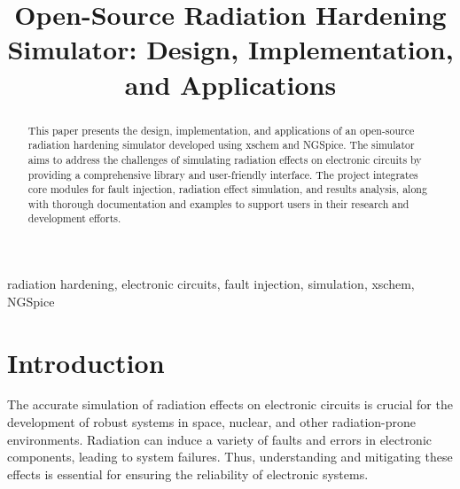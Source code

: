 \documentclass[conference]{IEEEtran}
\begin{document}
\title{Open-Source Radiation Hardening Simulator: Design, Implementation, and Applications}

\author{
\and
{}
\and
{}
\and
{}
}

\maketitle

\begin{abstract}
This paper presents the design, implementation, and applications of an open-source radiation hardening simulator developed using xschem and NGSpice. The simulator aims to address the challenges of simulating radiation effects on electronic circuits by providing a comprehensive library and user-friendly interface. The project integrates core modules for fault injection, radiation effect simulation, and results analysis, along with thorough documentation and examples to support users in their research and development efforts.
\end{abstract}

\begin{IEEEkeywords}
radiation hardening, electronic circuits, fault injection, simulation, xschem, NGSpice
\end{IEEEkeywords}

\section{Introduction}
The accurate simulation of radiation effects on electronic circuits is crucial for the development of robust systems in space, nuclear, and other radiation-prone environments. Radiation can induce a variety of faults and errors in electronic components, leading to system failures. Thus, understanding and mitigating these effects is essential for ensuring the reliability of electronic systems.
\end{document}
